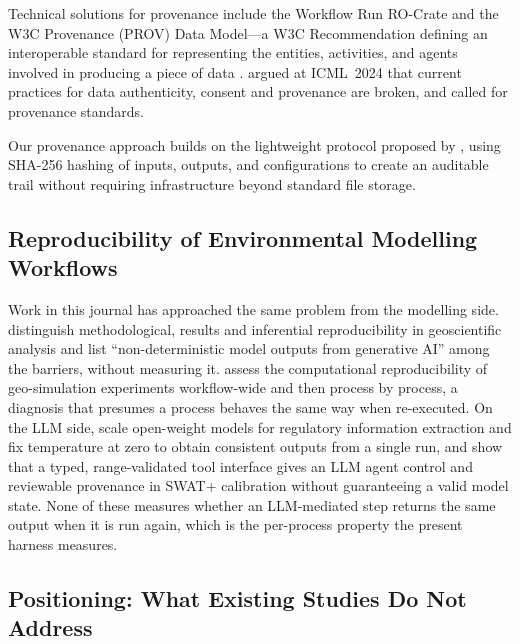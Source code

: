 \documentclass[preprint,review,12pt,authoryear]{elsarticle}
\begin{document}
Technical solutions for provenance include the Workflow Run RO-Crate \citep{leo2024rocrate} and the W3C Provenance (PROV) Data Model---a W3C Recommendation defining an interoperable standard for representing the entities, activities, and agents involved in producing a piece of data \citep{kale2023provenance}.
\citet{longpre2024broken} argued at ICML~2024 that current practices for data authenticity, consent and provenance are broken, and called for provenance standards.

Our provenance approach builds on the lightweight protocol proposed by \citet{rover2026jair}, using SHA-256 hashing of inputs, outputs, and configurations to create an auditable trail without requiring infrastructure beyond standard file storage.

\subsection{Reproducibility of Environmental Modelling Workflows}

Work in this journal has approached the same problem from the modelling side. \citet{schlogl2026reproducibility} distinguish methodological, results and inferential reproducibility in geoscientific analysis and list ``non-deterministic model outputs from generative AI'' among the barriers, without measuring it. \citet{zhu2025geosimulation} assess the computational reproducibility of geo-simulation experiments workflow-wide and then process by process, a diagnosis that presumes a process behaves the same way when re-executed. On the LLM side, \citet{yoon2026hydropower} scale open-weight models for regulatory information extraction and fix temperature at zero to obtain consistent outputs from a single run, and \citet{park2026toolinterfaces} show that a typed, range-validated tool interface gives an LLM agent control and reviewable provenance in SWAT+ calibration without guaranteeing a valid model state. None of these measures whether an LLM-mediated step returns the same output when it is run again, which is the per-process property the present harness measures.

\subsection{Positioning: What Existing Studies Do Not Address}
\end{document}
